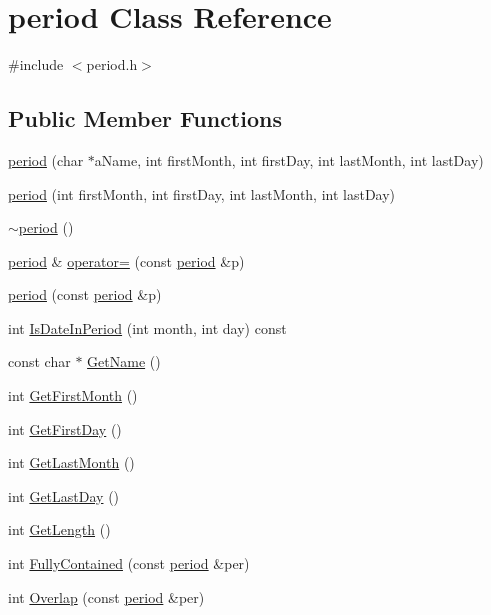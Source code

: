 \hypertarget{classperiod}{
\section{period Class Reference}
\label{classperiod}
}


{\ttfamily \#include $<$period.h$>$}\subsection*{Public Member Functions}
\begin{DoxyCompactItemize}
\item 
\hyperlink{classperiod_a8dba558cbe5839a6cafaa56190a181b2}{period} (char $\ast$aName, int firstMonth, int firstDay, int lastMonth, int lastDay)
\item 
\hyperlink{classperiod_ae724d1884ef14f0c62c3ca070216dcf8}{period} (int firstMonth, int firstDay, int lastMonth, int lastDay)
\item 
\hyperlink{classperiod_ad8c2607a3f178c1fbe14c85a77adf936}{$\sim$period} ()
\item 
\hyperlink{classperiod}{period} \& \hyperlink{classperiod_a977b1a065d2fac945da835e2baa1ce88}{operator=} (const \hyperlink{classperiod}{period} \&p)
\item 
\hyperlink{classperiod_a83a82ed64e5c82168451e978fc253556}{period} (const \hyperlink{classperiod}{period} \&p)
\item 
int \hyperlink{classperiod_a1036b3c6da47c233381926627e8b2e4e}{IsDateInPeriod} (int month, int day) const 
\item 
const char $\ast$ \hyperlink{classperiod_a8136239b5db53fc0321d3d7a52c015ac}{GetName} ()
\item 
int \hyperlink{classperiod_a82ce05d97cf5ba02cb6045cd746d502f}{GetFirstMonth} ()
\item 
int \hyperlink{classperiod_ab37ca75242f6032b529e8e1d6ccfa2ef}{GetFirstDay} ()
\item 
int \hyperlink{classperiod_a44a437719b012f10621691d2249068a1}{GetLastMonth} ()
\item 
int \hyperlink{classperiod_a9df06cfc009724e0d2ca926b8d161062}{GetLastDay} ()
\item 
int \hyperlink{classperiod_a1bb8fa04824fbe9309a2debd265c7b90}{GetLength} ()
\item 
int \hyperlink{classperiod_adfabc7cac131ab21bd24e488a2813ee8}{FullyContained} (const \hyperlink{classperiod}{period} \&per)
\item 
int \hyperlink{classperiod_a8cf7f0182e0718ee31c366981beda3c6}{Overlap} (const \hyperlink{classperiod}{period} \&per)
\end{DoxyCompactItemize}


